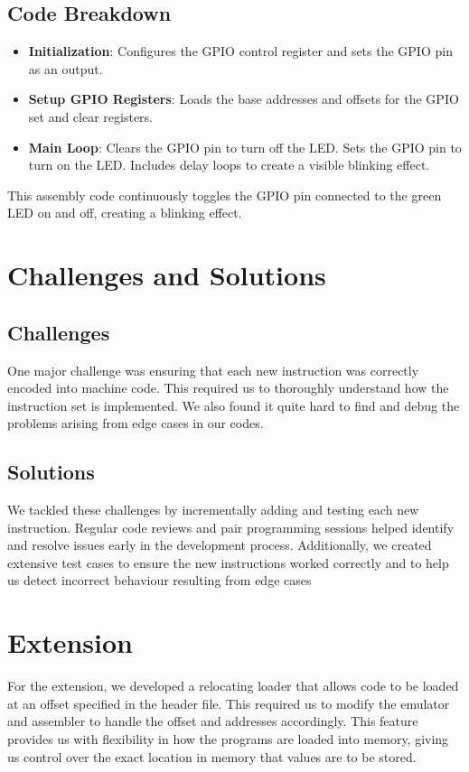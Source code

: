 \documentclass[a4paper, 10pt]{article}
\begin{document}
\subsection{Code Breakdown}
\begin{itemize}
    \item \textbf{Initialization}: Configures the GPIO control register and sets the GPIO pin as an output.
    \item \textbf{Setup GPIO Registers}: Loads the base addresses and offsets for the GPIO set and clear registers.
    \item \textbf{Main Loop}: Clears the GPIO pin to turn off the LED. Sets the GPIO pin to turn on the LED. Includes delay loops to create a visible blinking effect.
\end{itemize}

This assembly code continuously toggles the GPIO pin connected to the green LED on and off, creating a blinking effect.
\newline
\section{Challenges and Solutions}


\subsection{Challenges}
One major challenge was ensuring that each new instruction was correctly encoded into machine code. This required us to thoroughly understand how the instruction set is implemented. We also found it quite hard to find and debug the problems arising from edge cases in our codes.

\subsection{Solutions}
We tackled these challenges by incrementally adding and testing each new instruction. Regular code reviews and pair programming sessions helped identify and resolve issues early in the development process. Additionally, we created extensive test cases to ensure the new instructions worked correctly and to help us detect incorrect behaviour resulting from edge cases
\newline
\section{Extension}
For the extension, we developed a relocating loader that allows code to be loaded at an offset specified in the header file. This required us to modify the emulator and assembler to handle the offset and addresses accordingly. This feature provides us with flexibility in how the programs are loaded into memory, giving us control over the exact location in memory that values are to be stored.
\end{document}
